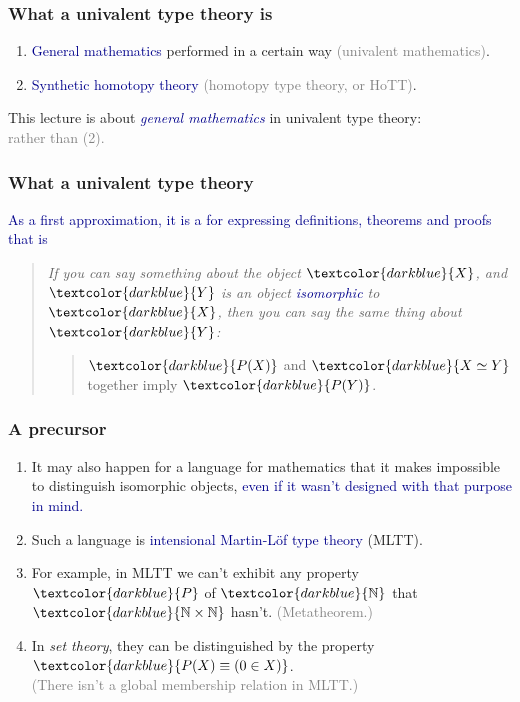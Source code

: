 \documentclass[aspectratio=169]{beamer}
\newcommand{\eqq}{\equiv}
\newcommand{\db}{\textcolor{darkblue}}
\newcommand{\dg}{\textcolor{darkgreen}}
\newcommand{\grey}{\textcolor{grey}}
\newcommand{\m}[1]{$\db{#1}$}
\newcommand{\N}{\mathbb{N}}
\begin{document}
\begin{frame}
  \frametitle{What a univalent type theory is }

  \begin{enumerate}
  \vfill \item \db{General mathematics} performed in a certain way \grey{(univalent mathematics)}.

  \vfill \item \db{Synthetic homotopy theory} \grey{(homotopy type theory, or HoTT)}.
  \end{enumerate}

\vfill

This lecture is about \emph{\db{general mathematics}} in univalent type theory: \\[1ex]
\grey{ rather than (2).}

\end{frame}

\begin{frame}
  \frametitle{What a univalent type theory }

\vfill

  \db{As a first approximation, it is a \framebox{\dg{mathematical language}} for expressing definitions, theorems and proofs that is
  \framebox{\dg{invariant under isomorphism:}}} 

\vfill
\begin{quote} \em
If you can say something about the object \m{X}, and \m{Y} is an object \db{isomorphic} to \m{X}, then you can say the same thing about \m{Y}: \\[3ex]
\begin{quote}
\m{P(X)} and \m{X \simeq Y} together imply \m{P(Y)}.
\end{quote}
\end{quote}

\end{frame}


\begin{frame}
  \frametitle{A precursor}

\begin{enumerate}
\vfill \item It may also happen for a language for mathematics that it makes impossible  to distinguish isomorphic objects, \db{even if it wasn't designed with that purpose in mind.}

\vfill \item Such a language is  \db{intensional Martin-L\"of type theory} (MLTT).
\vfill \item For example, in MLTT we can't exhibit any property \m{P} of \m{\N} that \m{\N \times \N} hasn't. \grey{(Metatheorem.)}
\vfill \item In \emph{set theory}, they can be distinguished by the property \m{P(X) \eqq (0 \in X)}. \\[1ex] 

\grey{(There isn't a global membership relation in MLTT.)} \\[1ex]

\end{enumerate}

\end{frame}
\end{document}
